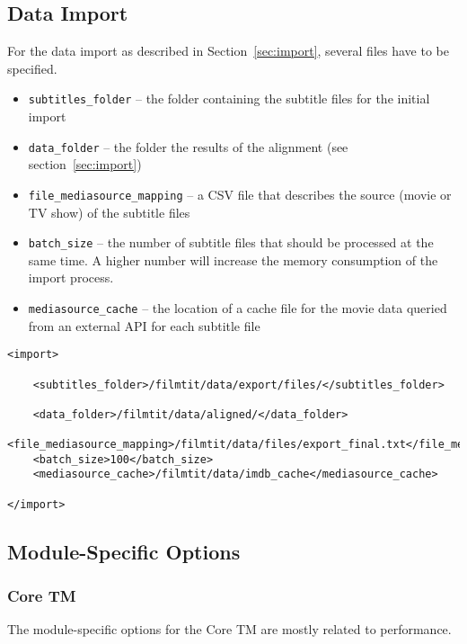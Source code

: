 \subsection{Data Import}
For the data import as described in Section~\ref{sec:import}, several files have to be specified.

\begin{itemize}
        \item \verb#subtitles_folder# -- the folder containing the subtitle files for the initial import
        \item \verb#data_folder# -- the folder the results of the alignment (see section~\ref{sec:import})
        \item \verb#file_mediasource_mapping# -- a CSV file that describes the source (movie or TV show) of the  subtitle files
        \item \verb#batch_size# -- the number of subtitle files that should be processed at the same time. A higher number will increase the memory consumption of the import process.
        \item \verb#mediasource_cache# -- the location of a cache file for the movie data queried from an external API for each subtitle file
        
\end{itemize}


\begin{lstlisting}
<import>

    <subtitles_folder>/filmtit/data/export/files/</subtitles_folder>

    <data_folder>/filmtit/data/aligned/</data_folder>
    <file_mediasource_mapping>/filmtit/data/files/export_final.txt</file_mediasource_mapping>
    <batch_size>100</batch_size>
    <mediasource_cache>/filmtit/data/imdb_cache</mediasource_cache>

</import>
\end{lstlisting}


\subsection{Module-Specific Options}

\subsubsection{Core TM}

The module-specific options for the Core TM are mostly related to performance.

